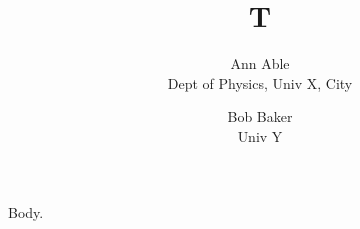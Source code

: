 \documentclass{article}
\title{T}
\author{Ann Able\footremember{zz}{Zebra note.}\\ Dept of Physics, Univ X, City \and Bob Baker\\ Univ Y}
\begin{document}
\maketitle
Body.
\end{document}
